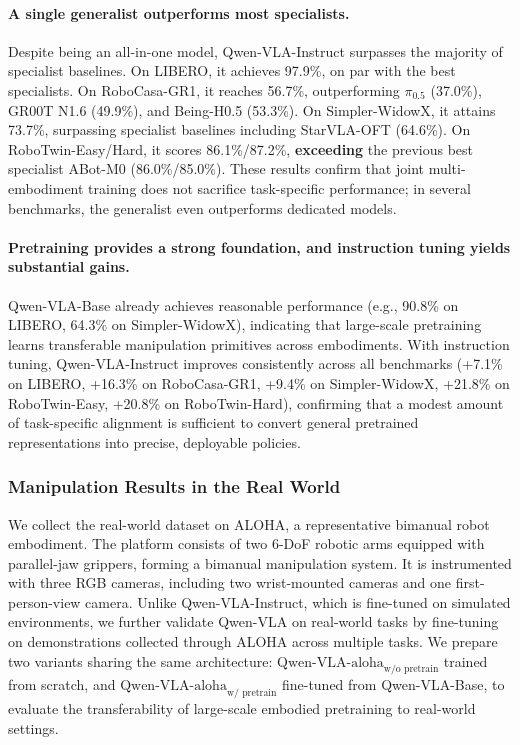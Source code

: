 \documentclass{llmxive}
\begin{document}
\paragraph{A single generalist outperforms most specialists.} Despite being an all-in-one model, Qwen-VLA-Instruct surpasses the majority of specialist baselines. On LIBERO, it achieves 97.9\%, on
par with the best specialists. On RoboCasa-GR1, it reaches 56.7\%, outperforming $\pi_{0.5}$ (37.0\%), GR00T N1.6 (49.9\%), and Being-H0.5 (53.3\%). On Simpler-WidowX, it attains
73.7\%, surpassing specialist baselines including StarVLA-OFT (64.6\%). On RoboTwin-Easy/Hard, it scores 86.1\%/87.2\%, \textbf{exceeding} the previous best specialist ABot-M0
(86.0\%/85.0\%). These results confirm that joint multi-embodiment training does not sacrifice task-specific performance; in several benchmarks, the generalist even outperforms dedicated
models.

\paragraph{Pretraining provides a strong foundation, and instruction tuning yields substantial gains.} Qwen-VLA-Base already achieves reasonable performance (e.g., 90.8\% on LIBERO, 64.3\% on
Simpler-WidowX), indicating that large-scale pretraining learns transferable manipulation primitives across embodiments. With instruction tuning, Qwen-VLA-Instruct improves consistently across
all benchmarks (+7.1\% on LIBERO, +16.3\% on RoboCasa-GR1, +9.4\% on Simpler-WidowX, +21.8\% on RoboTwin-Easy, +20.8\% on RoboTwin-Hard), confirming that a modest amount of task-specific alignment
is sufficient to convert general pretrained representations into precise, deployable policies.



\subsubsection{Manipulation Results in the Real World}
We collect the real-world dataset on ALOHA, a representative bimanual robot embodiment. The platform consists of two 6-DoF robotic arms equipped with parallel-jaw grippers, forming a bimanual manipulation system. It is instrumented with three RGB cameras, including two wrist-mounted cameras and one first-person-view camera.
Unlike Qwen-VLA-Instruct, which is fine-tuned on simulated environments, we further validate Qwen-VLA on real-world tasks by fine-tuning on demonstrations collected through ALOHA across multiple tasks. We prepare two variants sharing the same architecture: ${\text{Qwen-VLA-aloha}}_{\text{w/o pretrain}}$ trained from scratch, and ${\text{Qwen-VLA-aloha}}_{\text{w/ pretrain}}$ fine-tuned from Qwen-VLA-Base, to evaluate the transferability of large-scale embodied pretraining to real-world settings.
\end{document}
